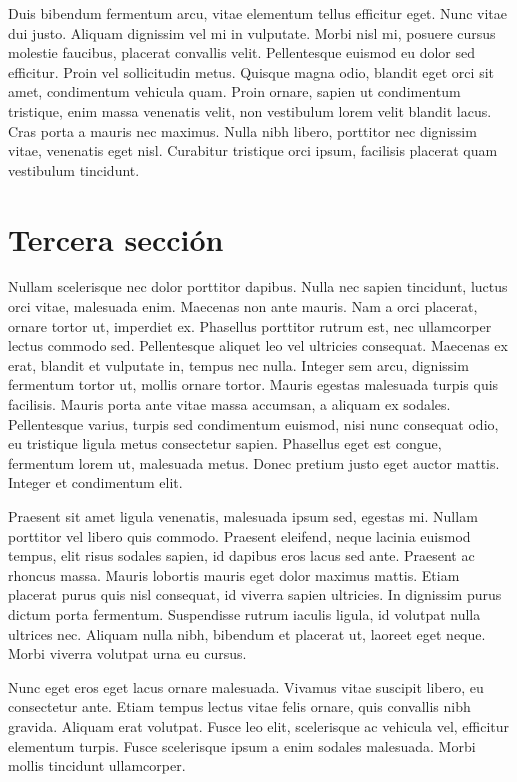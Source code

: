 \documentclass[a4paper,twoside=false,12pt,spanish,DIV=7]{scrbook}
\begin{document}
Duis bibendum fermentum arcu, vitae elementum tellus efficitur eget. Nunc vitae dui justo. Aliquam dignissim vel mi in vulputate. Morbi nisl mi, posuere cursus molestie faucibus, placerat convallis velit. Pellentesque euismod eu dolor sed efficitur. Proin vel sollicitudin metus. Quisque magna odio, blandit eget orci sit amet, condimentum vehicula quam. Proin ornare, sapien ut condimentum tristique, enim massa venenatis velit, non vestibulum lorem velit blandit lacus. Cras porta a mauris nec maximus. Nulla nibh libero, porttitor nec dignissim vitae, venenatis eget nisl. Curabitur tristique orci ipsum, facilisis placerat quam vestibulum tincidunt.

\section{Tercera sección}

Nullam scelerisque nec dolor porttitor dapibus. Nulla nec sapien tincidunt, luctus orci vitae, malesuada enim. Maecenas non ante mauris. Nam a orci placerat, ornare tortor ut, imperdiet ex. Phasellus porttitor rutrum est, nec ullamcorper lectus commodo sed. Pellentesque aliquet leo vel ultricies consequat. Maecenas ex erat, blandit et vulputate in, tempus nec nulla. Integer sem arcu, dignissim fermentum tortor ut, mollis ornare tortor. Mauris egestas malesuada turpis quis facilisis. Mauris porta ante vitae massa accumsan, a aliquam ex sodales. Pellentesque varius, turpis sed condimentum euismod, nisi nunc consequat odio, eu tristique ligula metus consectetur sapien. Phasellus eget est congue, fermentum lorem ut, malesuada metus. Donec pretium justo eget auctor mattis. Integer et condimentum elit.

Praesent sit amet ligula venenatis, malesuada ipsum sed, egestas mi. Nullam porttitor vel libero quis commodo. Praesent eleifend, neque lacinia euismod tempus, elit risus sodales sapien, id dapibus eros lacus sed ante. Praesent ac rhoncus massa. Mauris lobortis mauris eget dolor maximus mattis. Etiam placerat purus quis nisl consequat, id viverra sapien ultricies. In dignissim purus dictum porta fermentum. Suspendisse rutrum iaculis ligula, id volutpat nulla ultrices nec. Aliquam nulla nibh, bibendum et placerat ut, laoreet eget neque. Morbi viverra volutpat urna eu cursus.

Nunc eget eros eget lacus ornare malesuada. Vivamus vitae suscipit libero, eu consectetur ante. Etiam tempus lectus vitae felis ornare, quis convallis nibh gravida. Aliquam erat volutpat. Fusce leo elit, scelerisque ac vehicula vel, efficitur elementum turpis. Fusce scelerisque ipsum a enim sodales malesuada. Morbi mollis tincidunt ullamcorper.
\end{document}
